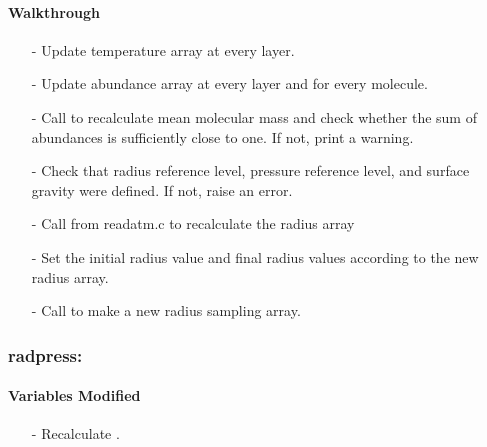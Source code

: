 \documentclass[letterpaper,12pt]{article}
\begin{document}
\paragraph{Walkthrough}
\begin{enumerate}[leftmargin=10pt, noitemsep, parsep=0pt, topsep=0ex]
\item[-] Update temperature array at every layer.
\item[-] Update abundance array at every layer and for every molecule.
\item[-] Call  to recalculate mean molecular mass and check whether the sum of abundances is sufficiently close to one. If not, print a warning.
\item[-] Check that radius reference level, pressure reference level, and surface gravity were defined. If not, raise an error.
\item[-] Call  from readatm.c to recalculate the radius array
\item[-] Set the initial radius value and final radius values according to the new radius array.
\item[-] Call  to make a new radius sampling array.
\end{enumerate}

\subsubsection{radpress:}
\paragraph{Variables Modified}
\begin{enumerate}[leftmargin=10pt, noitemsep, parsep=0pt, topsep=0ex]
\item[-] Recalculate .
\end{enumerate}
\end{document}
